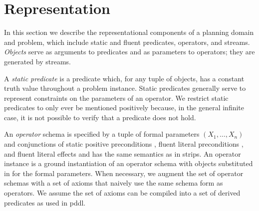 \documentclass[letterpaper]{article} %
\newcommand\note[1]{\todo[inline, color=blue!10, linecolor=blue!90,
  size=\footnotesize]{\linespread{0.9}\selectfont{{\bf CRG:} #1}\par}}
\newcommand\lpknote[1]{\todo[inline, color=green!10, linecolor=green!90,
  size=\footnotesize]{\linespread{0.9}\selectfont{{\bf LPK:} #1}\par}}
\theoremstyle{plain}\newtheorem{thm}{Theorem}
\theoremstyle{definition}\newtheorem{defn}{Definition}
\theoremstyle{plain}\newtheorem{lem}{Lemma}
\theoremstyle{plain}\newtheorem{cor}{Corollary}
\newcommand{\strips}{{\sc strips}}
\newcommand{\pddl}{{\sc pddl}}
\begin{document}


\section{Representation}
In this section we describe the representational components of a
planning domain and problem, which include static and fluent
predicates, operators, and streams.  {\em Objects} 
serve as arguments to predicates and as
parameters to operators;  they are generated by streams.

A {\em static predicate} is a predicate which, for any tuple of
objects, has a constant truth value throughout a problem instance.
Static predicates generally serve to represent constraints on the
parameters of an operator. We restrict static predicates to only ever 
be mentioned positively because, in the general infinite case, it is not possible to 
verify that a predicate does not hold.

An {\em operator} schema is specified by a tuple of formal parameters $(X_1,
\ldots, X_n)$ and conjunctions of static positive
preconditions , fluent literal preconditions , and
fluent literal effects  and has the same semantics as in \strips.
An operator instance is a ground instantiation of an operator schema
with objects substituted in for the formal parameters.
When necessary, we augment the set of operator schemas with a set of axioms
that naively use the same schema form as operators. We assume the set
of axioms can be compiled into a set of derived predicates as used in \pddl.   
\end{document}
